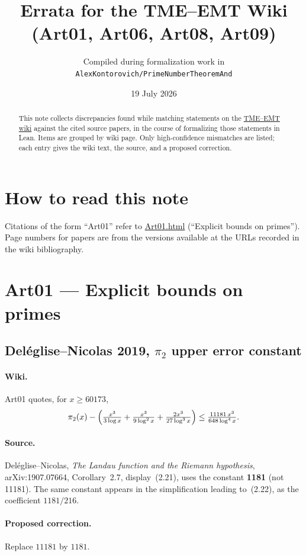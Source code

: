 \documentclass[11pt,a4paper]{article}
\title{Errata for the TME--EMT Wiki\\
\large(Art01, Art06, Art08, Art09)}
\author{Compiled during formalization work in\\
\texttt{AlexKontorovich/PrimeNumberTheoremAnd}}
\date{19 July 2026}
\begin{document}
\maketitle

\begin{abstract}
This note collects discrepancies found while matching statements on the
\href{https://archimede.pages.math.cnrs.fr/tme-emt-wiki/index.html}{TME--EMT wiki}
against the cited source papers, in the course of formalizing those
statements in Lean.  Items are grouped by wiki page.  Only high-confidence
mismatches are listed; each entry gives the wiki text, the source, and a
proposed correction.
\end{abstract}

\section*{How to read this note}
Citations of the form ``Art01'' refer to
\href{https://archimede.pages.math.cnrs.fr/tme-emt-wiki/Art01.html}{Art01.html}
(``Explicit bounds on primes'').  Page numbers for papers are from the
versions available at the URLs recorded in the wiki bibliography.

\section{Art01 --- Explicit bounds on primes}

\subsection{Del\'eglise--Nicolas 2019, $\pi_2$ upper error constant}
\label{err:dn-11181}
\paragraph{Wiki.}
Art01 quotes, for $x\ge 60173$,
\[
\pi_2(x)-\Bigl(\tfrac{x^3}{3\log x}+\tfrac{x^3}{9\log^2 x}+\tfrac{2x^3}{27\log^3 x}\Bigr)
\le \tfrac{11181\,x^3}{648\log^4 x}.
\]
\paragraph{Source.}
Del\'eglise--Nicolas, \emph{The Landau function and the Riemann hypothesis},
arXiv:1907.07664, Corollary~2.7, display~(2.21), uses the constant
\textbf{1181} (not 11181).  The same constant appears in the simplification
leading to~(2.22), as the coefficient $1181/216$.
\paragraph{Proposed correction.}
Replace $11181$ by $1181$.
\end{document}

